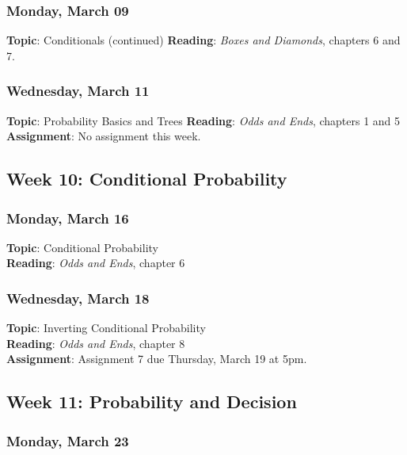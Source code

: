 \documentclass[
  letterpaper,
  DIV=11,
  numbers=noendperiod]{scrartcl}
\begin{document}
\subsubsection{Monday, March 09}\label{monday-march-09}

\textbf{Topic}: Conditionals (continued) \textbf{Reading}: \emph{Boxes
and Diamonds}, chapters 6 and 7.

\subsubsection{Wednesday, March 11}\label{wednesday-march-11}

\textbf{Topic}: Probability Basics and Trees \textbf{Reading}:
\emph{Odds and Ends}, chapters 1 and 5 \textbf{Assignment}: No
assignment this week.

\subsection{Week 10: Conditional
Probability}\label{week-10-conditional-probability}

\subsubsection{Monday, March 16}\label{monday-march-16}

\textbf{Topic}: Conditional Probability\\
\textbf{Reading}: \emph{Odds and Ends}, chapter 6

\subsubsection{Wednesday, March 18}\label{wednesday-march-18}

\textbf{Topic}: Inverting Conditional Probability\\
\textbf{Reading}: \emph{Odds and Ends}, chapter 8\\
\textbf{Assignment}: Assignment 7 due Thursday, March 19 at 5pm.

\subsection{Week 11: Probability and
Decision}\label{week-11-probability-and-decision}

\subsubsection{Monday, March 23}\label{monday-march-23}
\end{document}
